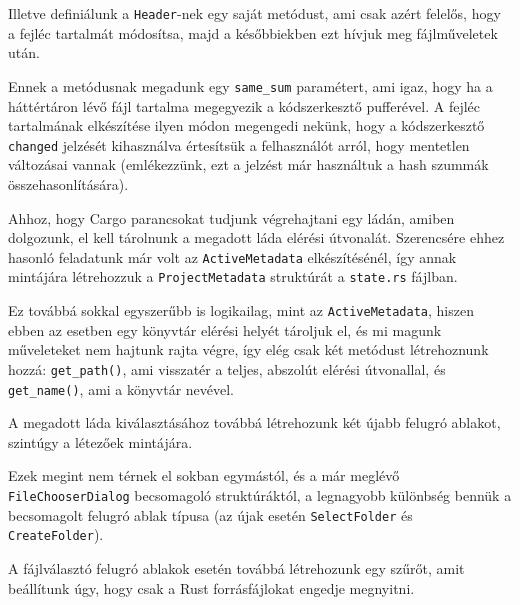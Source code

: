 Illetve definiálunk a \texttt{Header}-nek egy saját metódust, ami csak azért felelős,
hogy a fejléc tartalmát módosítsa, majd a későbbiekben ezt hívjuk meg fájlműveletek után.



Ennek a metódusnak megadunk egy \texttt{same\_sum} paramétert, ami igaz,
hogy ha a háttértáron lévő fájl tartalma megegyezik a kódszerkesztő pufferével.
A fejléc tartalmának elkészítése ilyen módon megengedi nekünk, hogy a kódszerkesztő \texttt{changed}
jelzését kihasználva értesítsük a felhasználót arról, hogy mentetlen változásai vannak
(emlékezzünk, ezt a jelzést már használtuk a hash szummák összehasonlítására).


Ahhoz, hogy Cargo parancsokat tudjunk végrehajtani egy ládán, amiben dolgozunk,
el kell tárolnunk a megadott láda elérési útvonalát.
Szerencsére ehhez hasonló feladatunk már volt az \texttt{ActiveMetadata} elkészítésénél,
így annak mintájára létrehozzuk a \texttt{ProjectMetadata} struktúrát a \texttt{state.rs} fájlban.



Ez továbbá sokkal egyszerűbb is logikailag, mint az \texttt{ActiveMetadata},
hiszen ebben az esetben egy könyvtár elérési helyét tároljuk el, és mi magunk műveleteket
nem hajtunk rajta végre, így elég csak két metódust létrehoznunk hozzá:
\texttt{get\_path()}, ami visszatér a teljes, abszolút elérési útvonallal,
és \texttt{get\_name()}, ami a könyvtár nevével.

A megadott láda kiválasztásához továbbá létrehozunk két újabb felugró ablakot,
szintúgy a létezőek mintájára.



Ezek megint nem térnek el sokban egymástól, és a már meglévő \texttt{FileChooserDialog} becsomagoló struktúráktól,
a legnagyobb különbség bennük a becsomagolt felugró ablak típusa 
(az újak esetén \texttt{SelectFolder} és \texttt{CreateFolder}).

A fájlválasztó felugró ablakok esetén továbbá létrehozunk egy szűrőt,
amit beállítunk úgy, hogy csak a Rust forrásfájlokat engedje megnyitni.



